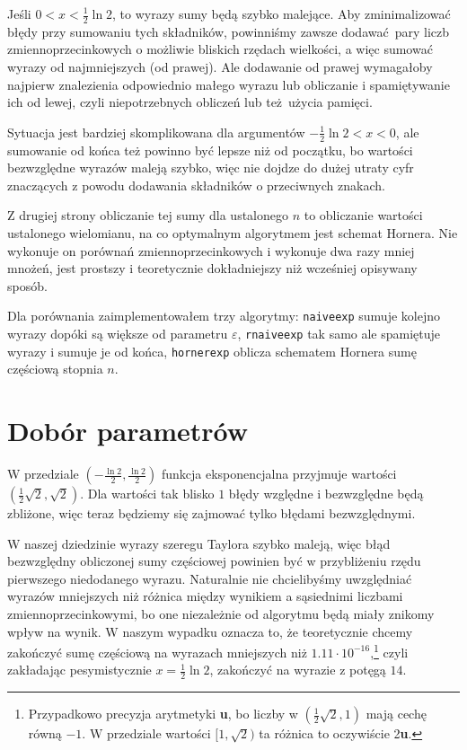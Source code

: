 \documentclass[a4paper, 12pt]{article}
\newcommand{\macheps}{\textsf{\textbf{u}}}
\begin{document}
Jeśli $0 < x < \frac{1}{2}\ln 2$, to wyrazy sumy będą szybko malejące.
Aby zminimalizować błędy przy sumowaniu tych składników, powinniśmy
zawsze dodawać pary liczb zmiennoprzecinkowych o możliwie bliskich rzędach
wielkości, a więc sumować wyrazy od najmniejszych (od prawej).
Ale dodawanie od prawej wymagałoby najpierw znalezienia odpowiednio
małego wyrazu lub obliczanie i spamiętywanie ich od lewej, czyli
niepotrzebnych obliczeń lub też użycia pamięci.

Sytuacja jest bardziej skomplikowana dla argumentów $-\frac{1}{2}\ln 2 < x < 0$,
ale sumowanie od końca też powinno być lepsze niż od początku, bo wartości
bezwzględne wyrazów maleją szybko, więc nie dojdze do dużej utraty cyfr
znaczących z powodu dodawania składników o przeciwnych znakach.

Z drugiej strony obliczanie tej sumy dla ustalonego $n$ to obliczanie wartości
ustalonego wielomianu, na co optymalnym algorytmem jest schemat Hornera.
Nie wykonuje on porównań zmiennoprzecinkowych i wykonuje dwa razy mniej mnożeń,
jest prostszy i teoretycznie dokładniejszy niż wcześniej opisywany sposób.

Dla porównania zaimplementowałem trzy algorytmy:
\texttt{naiveexp} sumuje kolejno wyrazy dopóki są większe od parametru $\varepsilon$,
\texttt{rnaiveexp} tak samo ale spamiętuje wyrazy i sumuje je od końca,
\texttt{hornerexp} oblicza schematem Hornera sumę częściową stopnia $n$.

\section{Dobór parametrów}
W przedziale $(-\frac{\ln 2}{2}, \frac{\ln 2}{2})$ funkcja eksponencjalna
przyjmuje wartości $(\frac{1}{2}\sqrt{2}, \sqrt{2})$.
Dla wartości tak blisko $1$ błędy względne i bezwzględne będą zbliżone, więc
teraz będziemy się zajmować tylko błędami bezwzględnymi.

W naszej dziedzinie wyrazy szeregu Taylora szybko maleją, więc błąd bezwzględny
obliczonej sumy częściowej powinien być w przybliżeniu rzędu pierwszego
niedodanego wyrazu.
Naturalnie nie chcielibyśmy uwzględniać wyrazów mniejszych niż różnica
między wynikiem a sąsiednimi liczbami zmiennoprzecinkowymi, bo one niezależnie
od algorytmu będą miały znikomy wpływ na wynik.
W naszym wypadku oznacza to, że teoretycznie chcemy zakończyć sumę częściową na
wyrazach mniejszych niż $1.11\cdot10^{-16}$,\footnote{
	Przypadkowo precyzja arytmetyki \macheps,
	bo liczby w $(\frac{1}{2}\sqrt{2}, 1)$ mają cechę równą $-1$.
	W przedziale wartości $[1, \sqrt{2})$ ta różnica to oczywiście 2\macheps.}
czyli zakładając pesymistycznie $x=\frac{1}{2}\ln 2$, zakończyć na wyrazie z
potęgą $14$.
\end{document}

